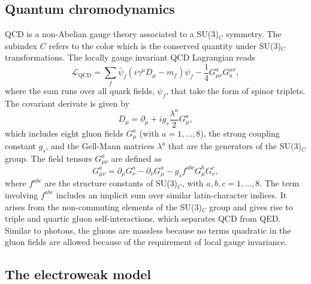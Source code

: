 \subsection{Quantum chromodynamics}
\label{subsec:qcd}
QCD is a non-Abelian gauge theory associated to a SU(3)$_C$ symmetry. The subindex $C$ refers to the color which is the conserved quantity under SU(3)$_C$ transformations.
The locally gauge invariant QCD Lagrangian reads
\begin{equation}
  \mathcal{L}_{\text{QCD}} = \sum_f \bar{\psi}_f(i\gamma^\mu D_\mu - m_f)\psi_f - \frac{1}{4}G_{\mu\nu}^aG^{\mu\nu}_{a},  \label{eq:lqcd}
\end{equation}
where the sum runs over all quark fields, $\psi_f$, that take the form of spinor triplets.
The covariant derivate is given by
\begin{equation}
  D_\mu = \partial_\mu + i g_s \frac{\lambda^a}{2} G_\mu^a,
\end{equation}
which includes eight gluon fields $G_\mu^a$ (with $a = 1, \ldots, 8$), the strong coupling constant $g_s$, and the Gell-Mann matrices $\lambda^a$ that are the generators of the SU(3)$_C$ group.
The field tensors $G_{\mu\nu}^a$ are defined as
\begin{equation}
  \label{eq:qcd-tensor}
  G_{\mu\nu}^a = \partial_\mu G_\nu^a - \partial_\nu G_\mu^a - g_s f^{abc}G_\mu^b G_\nu^c,
\end{equation}
where $f^{abc}$ are the structure constants of SU(3)$_C$, with $a, b, c = 1, \ldots, 8$.
The term involving $f^{abc}$ includes an implicit sum over similar latin-character indices. It arises from the non-commuting elements of the SU(3)$_C$ group and gives rise to triple and quartic gluon self-interactions, which separates QCD from QED.
Similar to photons, the gluons are massless because no terms quadratic in the gluon fields are allowed because of the requirement of local gauge invariance.



\subsection{The electroweak model}
\label{subsec:ew-model}

